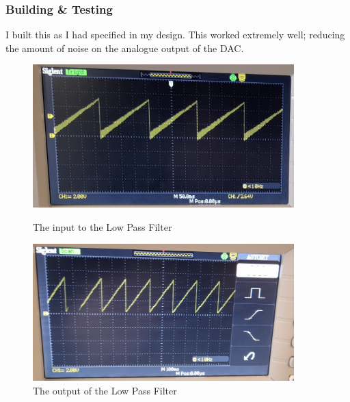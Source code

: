 \subsubsection{Building \& Testing}
I built this as I had specified in my design. This worked extremely well; reducing the amount of noise on the analogue output of the DAC.
\begin{figure} [H]
    \centering
    \begin{minipage}[t]{0.45\textwidth}
        \centering
        \includegraphics[width=0.9\textwidth]{images/lpfInputZoomed.jpg}
        \caption{The input to the Low Pass Filter}
        \label{fig:lpfInput}
    \end{minipage}\hfill
    \begin{minipage}[t]{0.45\textwidth}
        \centering
        \includegraphics[width=0.9\textwidth]{images/lpfOutputZoomed.jpg}
        \caption{The output of the Low Pass Filter}
         \label{fig:lpfOutput}
    \end{minipage}
\end{figure}
